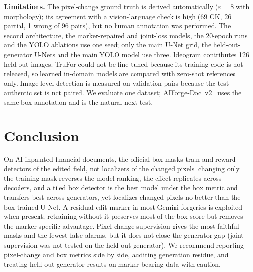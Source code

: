 \textbf{Limitations.} The pixel-change ground truth is derived automatically ($\varepsilon{=}8$ with morphology); its agreement with a vision-language check is high (69 OK, 26 partial, 1 wrong of 96 pairs), but no human annotation was performed. The second architecture, the marker-repaired and joint-loss models, the 20-epoch runs and the YOLO ablations use one seed; only the main U-Net grid, the held-out-generator U-Nets and the main YOLO model use three. Ideogram contributes 126 held-out images. TruFor could not be fine-tuned because its training code is not released, so learned in-domain models are compared with zero-shot references only. Image-level detection is measured on validation pairs because the test authentic set is not paired. We evaluate one dataset; AIForge-Doc~v2~\cite{wu2026aiforgedocv2} uses the same box annotation and is the natural next test.

\section{Conclusion}
\label{sec:conclusion}
On AI-inpainted financial documents, the official box masks train and reward detectors of the edited field, not localizers of the changed pixels: changing only the training mask reverses the model ranking, the effect replicates across decoders, and a tiled box detector is the best model under the box metric and transfers best across generators, yet localizes changed pixels no better than the box-trained U-Net. A residual edit marker in most Gemini forgeries is exploited when present; retraining without it preserves most of the box score but removes the marker-specific advantage. Pixel-change supervision gives the most faithful masks and the fewest false alarms, but it does not close the generator gap (joint supervision was not tested on the held-out generator). We recommend reporting pixel-change and box metrics side by side, auditing generation residue, and treating held-out-generator results on marker-bearing data with caution.
